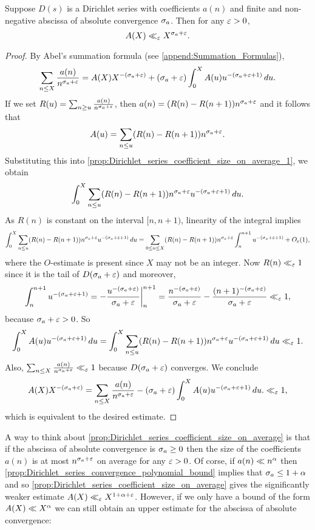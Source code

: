       \begin{proposition}\label{prop:Dirichlet_series_coefficient_size_on_average}
        Suppose $D(s)$ is a Dirichlet series with coefficients $a(n)$ and finite and non-negative abscissa of absolute convergence $\sigma_{a}$. Then for any $\varepsilon > 0$,
        \[
          A(X) \ll_{\varepsilon} X^{\sigma_{a}+\varepsilon}.
        \]
      \end{proposition}
      \begin{proof}
        By Abel's summation formula (see \cref{append:Summation_Formulas}),
        \begin{equation}\label{prop:Dirichlet_series_coefficient_size_on_average_1}
          \sum_{n \le X}\frac{a(n)}{n^{\sigma_{a}+\varepsilon}} = A(X)X^{-(\sigma_{a}+\varepsilon)}+(\sigma_{a}+\varepsilon)\int_{0}^{X}A(u)u^{-(\sigma_{a}+\varepsilon+1)}\,du.
        \end{equation}
        If we set $R(u) = \sum_{n \ge u}\frac{a(n)}{n^{\sigma_{a}+\varepsilon}}$, then $a(n) = (R(n)-R(n+1))n^{\sigma_{a}+\varepsilon}$ and it follows that
        \[
          A(u) = \sum_{n \le u}(R(n)-R(n+1))n^{\sigma_{a}+\varepsilon}.
        \]
        Substituting this into \cref{prop:Dirichlet_series_coefficient_size_on_average_1}, we obtain
        \[
          \int_{0}^{X}\sum_{n \le u}(R(n)-R(n+1))n^{\sigma_{a}+\varepsilon}u^{-(\sigma_{a}+\varepsilon+1)}\,du.
        \]
        As $R(n)$ is constant on the interval $[n,n+1)$, linearity of the integral implies
        \[
          \int_{0}^{X}\sum_{n \le u}(R(n)-R(n+1))n^{\sigma_{a}+\varepsilon}u^{-(\sigma_{a}+\varepsilon+1)}\,du = \sum_{0 \le n \le X}(R(n)-R(n+1))n^{\sigma_{a}+\varepsilon}\int_{n}^{n+1}u^{-(\sigma_{a}+\varepsilon+1)}+O_{\varepsilon}(1),
        \]
        where the $O$-estimate is present since $X$ may not be an integer. Now $R(n) \ll_{\varepsilon} 1$ since it is the tail of $D(\sigma_{a}+\varepsilon)$ and moreover,
        \[
          \int_{n}^{n+1}u^{-(\sigma_{a}+\varepsilon+1)} = -\frac{u^{-(\sigma_{a}+\varepsilon)}}{\sigma_{a}+\varepsilon}\bigg|_{n}^{n+1} = \frac{n^{-(\sigma_{a}+\varepsilon)}}{\sigma_{a}+\varepsilon}-\frac{(n+1)^{-(\sigma_{a}+\varepsilon)}}{\sigma_{a}+\varepsilon} \ll_{\varepsilon} 1,
        \]
        because $\sigma_{a}+\varepsilon > 0$. So
        \[
          \int_{0}^{X}A(u)u^{-(\sigma_{a}+\varepsilon+1)}\,du = \int_{0}^{X}\sum_{n \le u}(R(n)-R(n+1))n^{\sigma_{a}+\varepsilon}u^{-(\sigma_{a}+\varepsilon+1)}\,du \ll_{\varepsilon} 1.
        \]
        Also, $\sum_{n \le X}\frac{a(n)}{n^{\sigma_{a}+\varepsilon}} \ll_{\varepsilon} 1$ because $D(\sigma_{a}+\varepsilon)$ converges. We conclude
        \[
          A(X)X^{-(\sigma_{a}+\varepsilon)} = \sum_{n \le X}\frac{a(n)}{n^{\sigma_{a}+\varepsilon}}-(\sigma_{a}+\varepsilon)\int_{0}^{X}A(u)u^{-(\sigma_{a}+\varepsilon+1)}\,du. \ll_{\varepsilon} 1,
        \]
        which is equivalent to the desired estimate.
      \end{proof}

      A way to think about \cref{prop:Dirichlet_series_coefficient_size_on_average} is that if the abscissa of absolute convergence is $\sigma_{a} \ge 0$ then the size of the coefficients $a(n)$ is at most $n^{\sigma_{a}+\varepsilon}$ on average for any $\varepsilon > 0$. Of corse, if $a(n) \ll n^{\alpha}$ then \cref{prop:Dirichlet_series_convergence_polynomial_bound} implies that $\sigma_{a} \le 1+\alpha$ and so \cref{prop:Dirichlet_series_coefficient_size_on_average} gives the significantly weaker estimate $A(X) \ll_{\varepsilon} X^{1+\alpha+\varepsilon}$. However, if we only have a bound of the form $A(X) \ll X^{\alpha}$ we can still obtain an upper estimate for the abscissa of absolute convergence:


